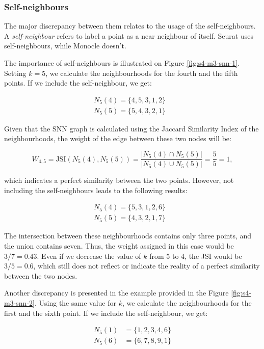 \subsubsection{Self-neighbours}
The major discrepancy between them relates to the usage of the self-neighbours. A \textit{self-neighbour} refers to label a point as a near neighbour of itself. Seurat uses self-neighbours, while Monocle doesn't.

The importance of self-neighbours is illustrated on Figure \ref{fig:s4-m3-snn-1}. Setting $k = 5$, we calculate the neighbourhoods for the fourth and the fifth points. If we include the self-neighbour, we get:

\[ \begin{aligned}
    N_5(4) = \{4,5,3,1,2\}& \\
    N_5(5) = \{5,4,3,2,1\}
    \end{aligned}
\]

Given that the SNN graph is calculated using the Jaccard Similarity Index of the neighbourhoods, the weight of the edge between these two nodes will be:

\[ W_{4,5} = \textrm{JSI}(N_5(4), N_5(5)) = \frac{|N_5(4) \cap N_5(5)|}{|N_5(4) \cup N_5(5)|} = \frac{5}{5} = 1 ,\]

which indicates a perfect similarity between the two points. However, not including the self-neighbours leads to the following results:

\[ \begin{aligned}
    N_5(4) = \{5,3,1,2,6\}& \\
    N_5(5) = \{4,3,2,1,7\}
    \end{aligned}
\]

The intersection between these neighbourhoods contains only three points, and the union contains seven. Thus, the weight assigned in this case would be $3 / 7 = 0.43$. Even if we decrease the value of $k$ from 5 to 4, the JSI would be $3 / 5 = 0.6$, which still does not reflect or indicate the reality of a perfect similarity between the two nodes.

Another discrepancy is presented in the example provided in the Figure \ref{fig:s4-m3-snn-2}. Using the same value for $k$, we calculate the neighbourhoods for the first and the sixth point. If we include the self-neighbour, we get:

\[ \begin{aligned}
    N_5(1) &= \{1,2,3,4,6\} \\
    N_5(6) &= \{6,7,8,9,1\}
    \end{aligned}
\]

